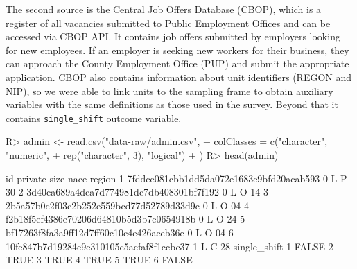 \documentclass[
]{jss}
\begin{document}
The second source is the Central Job Offers Database (CBOP), which is a
register of all vacancies submitted to Public Employment Offices and can
be accessed via CBOP API. It contains job offers submitted by employers
looking for new employees. If an employer is seeking new workers for
their business, they can approach the County Employment Office (PUP) and
submit the appropriate application. CBOP also contains information about
unit identifiers (REGON and NIP), so we were able to link units to the
sampling frame to obtain auxiliary variables with the same definitions
as those used in the survey. Beyond that it contains
\texttt{single\_shift} outcome variable.

\begin{CodeChunk}
\begin{CodeInput}
R> admin <- read.csv("data-raw/admin.csv",
+                  colClasses = c("character", "numeric",
+                                 rep("character", 3), "logical")
+                  )
R> head(admin)
\end{CodeInput}
\begin{CodeOutput}
                                        id private size nace region
1 7fddce081cbb1dd5da072e1683e9bfd20acab593       0    L    P     30
2 3d40ca689a4dca7d774981dc7db408301bf7f192       0    L    O     14
3 2b5a57b0c2f03c2b252e559bcd77d52789d33d9c       0    L    O     04
4 f2b18f5ef4386e70206d64810b5d3b7e0654918b       0    L    O     24
5 bf17263f8fa3a9ff12d7ff60c10c4e426aeeb36e       0    L    O     04
6 10fe847b7d19284e9e310105c5acfaf8f1ccbc37       1    L    C     28
  single_shift
1        FALSE
2         TRUE
3         TRUE
4         TRUE
5         TRUE
6        FALSE
\end{CodeOutput}
\end{CodeChunk}

\renewcommand\refname{Summary}

\end{document}
